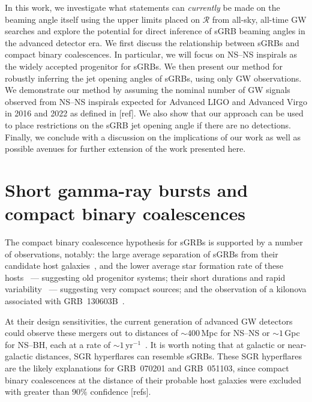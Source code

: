 \documentclass[twocolumn,nofootinbib]{revtex4-1}
\newcommand{\cbcrate}{{{\mathcal R}}}
\newcommand{\BNS}{\ac{NS}--\ac{NS}\xspace}
\newcommand{\NSBH}{\ac{NS}--\ac{BH}\xspace}
\begin{document}
In this work, we investigate what statements can \emph{currently} be made on the beaming angle itself using the upper limits placed on $\cbcrate$ from all-sky, all-time \ac{GW} searches and explore the potential for direct inference of \ac{sGRB}  beaming angles in the advanced detector era.
We first discuss the relationship between \acp{sGRB} and compact binary coalescences.
In particular, we will focus on \BNS inspirals as the widely accepted progenitor for \acp{sGRB}.
We then present our method for robustly inferring the jet opening angles of \acp{sGRB}, using only \ac{GW} observations.
We demonstrate our method by assuming the nominal number of \ac{GW} signals observed from \BNS inspirals expected for Advanced LIGO and Advanced Virgo in 2016 and 2022 as defined in [ref].
We also show that our approach can be used to place restrictions on the \ac{sGRB} jet opening angle if there are no detections.
Finally, we conclude with a discussion on the implications of our work as well as possible avenues for further extension of the work presented here.


\section{Short gamma-ray bursts and compact binary coalescences}
\label{sec:sgrbs}
The compact binary coalescence hypothesis for \acp{sGRB} is supported by a number of observations, notably: the large average separation of \acp{sGRB} from their candidate host galaxies~\cite{Church:2011gk}, and the lower average star formation rate of these hosts~\cite{Fong:2013eqa} --- suggesting old progenitor systems; their short durations and rapid variability~\cite{Rees:1994nw} --- suggesting very compact sources; and the observation of a kilonova associated with GRB~130603B~\cite{Berger:2013wna,Tanvir:2013pia}.

At their design sensitivities, the current generation of advanced \ac{GW} detectors could observe these mergers out to distances of $\sim 400\,$Mpc for \BNS or $\sim 1\,$Gpc for \NSBH, each at a rate of $\sim 1\,$yr$^{-1}$~\cite{MetzgerBerger, Clark:2014ut}.
It is worth noting that at galactic or near-galactic distances, \ac{SGR} hyperflares can resemble \acp{sGRB}.
These \ac{SGR} hyperflares are the likely explanations for GRB~070201 and GRB~051103, since compact binary coalescences at the distance of their probable host galaxies were excluded with greater than $90\%$ confidence [refs]. 
\end{document}
